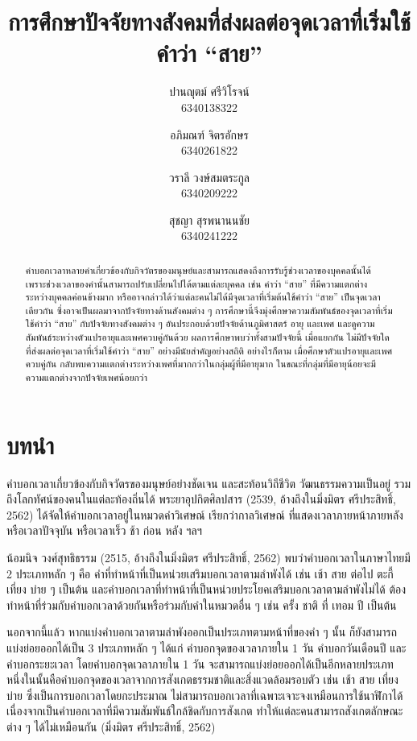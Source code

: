 \documentclass[a4paper]{article}
\title{การศึกษาปัจจัยทางสังคมที่ส่งผลต่อจุดเวลาที่เริ่มใช้คำว่า “สาย”}
\author{
    ปานญุตม์ ศรีวิโรจน์\\6340138322
    \and
    อภิมณฑ์ จิตรอักษร\\6340261822
    \and
    วราลี วงษ์สมตระกูล\\6340209222
    \and
    สุชญา สุรพนานนชัย\\6340241222
}
\date{}
\begin{document}
\maketitle
\begin{abstract}
    คำบอกเวลาหลายคำเกี่ยวข้องกับกิจวัตรของมนุษย์และสามารถแสดงถึงการรับรู้ช่วงเวลาของบุคคลนั้นได้ เพราะช่วงเวลาของคำนั้นสามารถปรับเปลี่ยนไปได้ตามแต่ละบุคคล เช่น คำว่า “สาย” ที่มีความแตกต่างระหว่างบุคคลค่อนข้างมาก หรืออาจกล่าวได้ว่าแต่ละคนไม่ได้มีจุดเวลาที่เริ่มต้นใช้คำว่า “สาย” เป็นจุดเวลาเดียวกัน ซึ่งอาจเป็นผลมาจากปัจจัยทางด้านสังคมต่าง ๆ การศึกษานี้จึงมุ่งศึกษาความสัมพันธ์ของจุดเวลาที่เริ่มใช้คำว่า “สาย” กับปัจจัยทางสังคมต่าง ๆ อันประกอบด้วยปัจจัยด้านภูมิศาสตร์ อายุ และเพศ และดูความสัมพันธ์ระหว่างตัวแปรอายุและเพศควบคู่กันด้วย ผลการศึกษาพบว่าทั้งสามปัจจัยนี้ เมื่อแยกกัน ไม่มีปัจจัยใดที่ส่งผลต่อจุดเวลาที่เริ่มใช้คำว่า “สาย” อย่างมีนัยสำคัญอย่างสถิติ อย่างไรก็ตาม เมื่อศึกษาตัวแปรอายุและเพศควบคู่กัน กลับพบความแตกต่างระหว่างเพศที่มากกว่าในกลุ่มผู้ที่มีอายุมาก ในขณะที่กลุ่มที่มีอายุน้อยจะมีความแตกต่างจากปัจจัยเพศน้อยกว่า
\end{abstract}
\section{บทนำ}
    คำบอกเวลาเกี่ยวข้องกับกิจวัตรของมนุษย์อย่างชัดเจน และสะท้อนวิถีชีวิต วัฒนธรรมความเป็นอยู่ รวมถึงโลกทัศน์ของคนในแต่ละท้องถิ่นได้ พระยาอุปกิตศิลปสาร (2539, อ้างถึงในมิ่งมิตร ศรีประสิทธิ์, 2562) ได้จัดให้คำบอกเวลาอยู่ในหมวดคำวิเศษณ์ เรียกว่ากาลวิเศษณ์ ที่แสดงเวลาภายหน้าภายหลัง หรือเวลาปัจจุบัน หรือเวลาเร็ว ช้า ก่อน หลัง ฯลฯ

    น้อมนิจ วงศ์สุทธิธรรม (2515, อ้างถึงในมิ่งมิตร ศรีประสิทธิ์, 2562) พบว่าคำบอกเวลาในภาษาไทยมี 2 ประเภทหลัก ๆ คือ คำที่ทำหน้าที่เป็นหน่วยเสริมบอกเวลาตามลำพังได้ เช่น เช้า สาย ต่อไป ตะกี้ เที่ยง บ่าย ๆ เป็นต้น และคำบอกเวลาที่ทำหน้าที่เป็นหน่วยประโยคเสริมบอกเวลาตามลำพังไม่ได้ ต้องทำหน้าที่ร่วมกับคำบอกเวลาด้วยกันหรือร่วมกับคำในหมวด\break อื่น ๆ เช่น ครั้ง ชาติ ที่ เทอม ปี เป็นต้น

    นอกจากนี้แล้ว หากแบ่งคำบอกเวลาตามลำพังออกเป็นประเภทตามหน้าที่ของคำ ๆ นั้น ก็ยังสามารถแบ่งย่อยออกได้เป็น 3 ประเภทหลัก ๆ ได้แก่ คำบอกจุดของเวลาภายใน 1 วัน คำบอกวันเดือนปี และคำบอกระยะเวลา โดยคำบอกจุดเวลาภายใน 1 วัน จะสามารถแบ่งย่อยออกได้เป็นอีกหลายประเภท  หนึ่งในนั้นคือคำบอกจุดของเวลาจากการสังเกตธรรมชาติและสิ่งแวดล้อมรอบตัว เช่น เช้า สาย เที่ยง บ่าย ซึ่งเป็นการบอกเวลาโดยกะประมาณ ไม่สามารถบอกเวลาที่เฉพาะเจาะจงเหมือนการใช้นาฬิกาได้ เนื่องจากเป็นคำบอกเวลาที่มีความสัมพันธ์ใกล้ชิดกับการสังเกต ทำให้แต่ละคนสามารถสังเกตลักษณะ\break ต่าง ๆ ได้ไม่เหมือนกัน (มิ่งมิตร ศรีประสิทธิ์, 2562)
\end{document}
